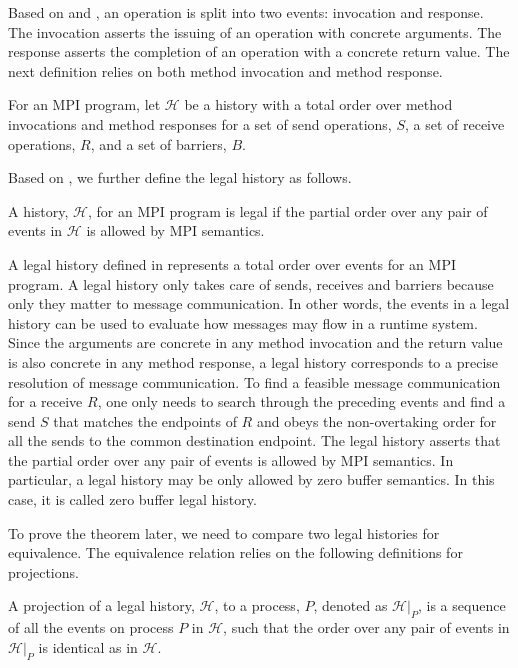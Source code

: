 Based on  and , an operation is split into two events: invocation and response. The invocation asserts the issuing of an operation with concrete arguments. The response asserts the completion of an operation with a concrete return value. The next definition relies on both method invocation and method response. 

\begin{definition}[History]\label{def:history}
For an MPI program, let $\mathcal{H}$ be a history with a total order over method invocations and method responses for a set of send operations, $S$, a set of receive operations, $R$, and a set of barriers, $B$.
\end{definition}

Based on , we further define the legal history as follows.

\begin{definition}\label{def:legal}
A history, $\mathcal{H}$, for an MPI program is legal if the partial order over any pair of events in $\mathcal{H}$ is allowed by MPI semantics.
\end{definition}

A legal history defined in  represents a total order over events for an MPI program. A legal history only takes care of sends, receives and barriers because only they matter to message communication. In other words, the events in a legal history can be used to evaluate how messages may flow in a runtime system. Since the arguments are concrete in any method invocation and the return value is also concrete in any method response, a legal history corresponds to a precise resolution of message communication. To find a feasible message communication for a receive $R$, one only needs to search through the preceding events and find a send $S$ that matches the endpoints of $R$ and obeys the non-overtaking order for all the sends to the common destination endpoint. The legal history asserts that the partial order over any pair of events is allowed by MPI semantics. In particular, a legal history may be only allowed by zero buffer semantics. In this case, it is called zero buffer legal history.

To prove the theorem later, we need to compare two legal histories for equivalence. The equivalence relation relies on the following definitions for projections. 

\begin{definition}\label{def:projection_process}
A projection of a legal history, $\mathcal{H}$, to a process, $P$, denoted as $\mathcal{H} | _P$, is a sequence of all the events on process $P$ in $\mathcal{H}$, such that the order over any pair of events in $\mathcal{H} | _P$ is identical as in $\mathcal{H}$.
\end{definition}

